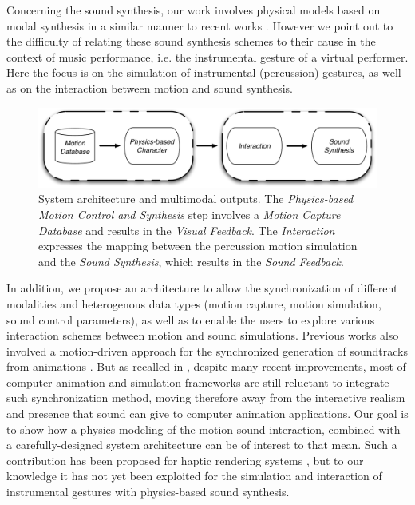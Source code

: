 Concerning the sound synthesis, our work involves physical models based on modal synthesis in a similar manner to recent works . However we point out to the difficulty of relating these sound synthesis schemes to their cause in the context of music performance, i.e. the instrumental gesture of a virtual performer. Here the focus is on the simulation of instrumental (percussion) gestures, as well as on the interaction between motion and sound synthesis.\\

\begin{figure}%
	\centering
	\includegraphics[width=0.9\linewidth]{Chapters/5/Pics/Pdf/overview3.pdf}
	\caption[System architecture and multimodal outputs]{System architecture and multimodal outputs. The {\it Physics-based Motion Control and Synthesis} step involves a {\it Motion Capture Database} and results in the {\it Visual Feedback}. The {\it Interaction} expresses the mapping between the percussion motion simulation and the {\it Sound Synthesis}, which results in the {\it Sound Feedback}.}
	\label{fig:overview}
\end{figure}

In addition, we propose an architecture to allow the synchronization of different modalities and heterogenous data types (motion capture, motion simulation, sound control parameters), as well as to enable the users to explore various interaction schemes between motion and sound simulations. Previous works also involved a motion-driven approach for the synchronized generation of soundtracks from animations . But as recalled in , despite many recent improvements, most of computer animation and simulation frameworks are still reluctant to integrate such synchronization method, moving therefore away from the interactive realism and presence that sound can give to computer animation applications. Our goal is to show how a physics modeling of the motion-sound interaction, combined with a carefully-designed system architecture can be of interest to that mean. Such a contribution has been proposed for haptic rendering systems , but to our knowledge it has not yet been exploited for the simulation and interaction of instrumental gestures with physics-based sound synthesis.

